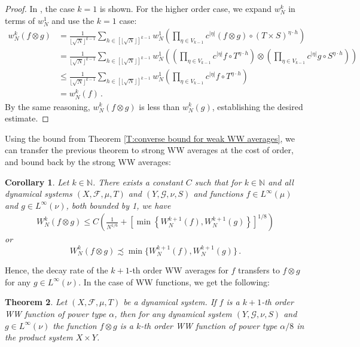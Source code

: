 \documentclass[11pt, oneside]{amsart}   	%
\newcommand{\1}{\mathbbm{1}}
\newcommand{\N}{\mathbb{N}}
\newcommand{\floor}[1]{\lfloor#1\rfloor}
\newtheorem{theorem}{Theorem}[section]
\newtheorem{corollary}[theorem]{Corollary}
\theoremstyle{definition}
\begin{document}
\begin{proof}
In \cite{assani04}, the case $k=1$ is shown. For the higher order case, we expand $w_N^k$ in terms of $w_N^1$ and use the $k=1$ case:
\begin{align*}
w_N^k(f \otimes g) &= \frac{1}{\floor{\sqrt{N}}^{k-1}}\sum_{h\in [\floor{\sqrt{N}}]^{k-1}} w^{1}_N \left( \prod_{\eta\in V_{k-1}} c^{|\eta|} (f \otimes g)\circ (T\times S)^{\eta \cdot h}  \right) \\
&= \frac{1}{\floor{\sqrt{N}}^{k-1}}\sum_{h\in [\floor{\sqrt{N}}]^{k-1}} w^{1}_N \left( \left(\prod_{\eta\in V_{k-1}} c^{|\eta|} f \circ T^{\eta \cdot h} \right)\otimes \left(\prod_{\eta\in V_{k-1}} c^{|\eta|}g \circ S^{\eta \cdot h}\right) \right) \\
&\leq \frac{1}{\floor{\sqrt{N}}^{k-1}}\sum_{h\in [\floor{\sqrt{N}}]^{k-1}} w^{1}_N \left( \prod_{\eta\in V_{k-1}} c^{|\eta|} f \circ T^{\eta \cdot h}  \right) \\
&= w_N^k(f) \, .
\end{align*}
By the same reasoning, $w_N^k(f \otimes g)$ is less than $w_N^k(g)$, establishing the desired estimate.
\end{proof}

Using the bound from Theorem \ref{T:converse bound for weak WW averages}, we can transfer the previous theorem to strong WW averages at the cost of order, and bound back by the strong WW averages:

\begin{corollary}\label{C:product bound for strong WW averages}
Let $k\in \N$. There exists a constant $C$ such that for $k\in \N$ and all dynamical systems $(X, \mathcal{F}, \mu, T)$ and $(Y, \mathcal{G}, \nu, S)$ and functions $f\in L^\infty(\mu)$ and $g\in L^\infty(\nu)$, both bounded by 1, we have
\begin{align*}
W_N^k(f \otimes g) \leq C\left(\frac{1}{N^{1/6}} + \left[\min \left\{W_N^{k+1}(f), W_N^{k+1}(g)\right\}\right]^{1/8} \right)
\end{align*}
or
$$W_N^k(f \otimes g) \precsim \min\{W_N^{k+1}(f), W_N^{k+1}(g)\} \, .$$
\end{corollary}

Hence, the decay rate of the $k+1$-th order WW averages for $f$ transfers to $f\otimes g$ for any $g\in L^\infty(\nu)$. In the case of WW functions, we get the following:
\begin{theorem}\label{T:product of WW functions}
Let $(X, \mathcal{F},  \mu, T)$ be a dynamical system. If $f$ is a $k+1$-th order WW function of power type $\alpha$, then for any dynamical system $(Y,\mathcal{G}, \nu, S)$ and $g\in L^\infty(\nu)$ the function $f\otimes g$ is a $k$-th order WW function of power type $\alpha/8$ in the product system $X\times Y$.
\end{theorem}
\end{document}

